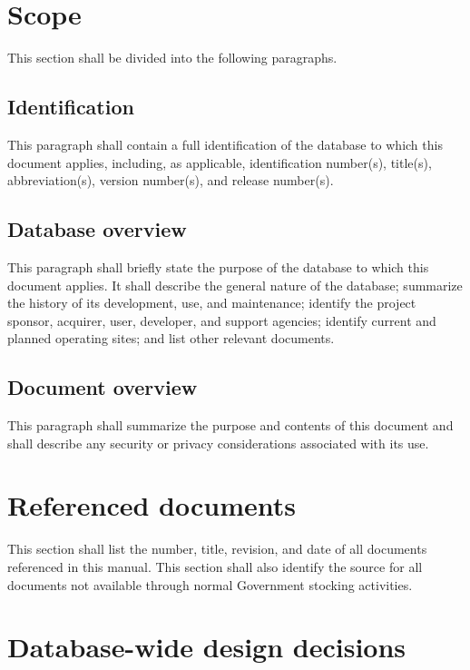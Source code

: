 \documentclass{fidata-report-template}
\begin{document}
\section{Scope}

This section shall be divided into the following paragraphs.

\subsection{Identification}

This paragraph shall contain a full identification of the database to
which this document applies, including, as applicable, identification
number(s), title(s), abbreviation(s), version number(s), and release
number(s).

\subsection{Database overview}

This paragraph shall briefly state the purpose of the database to which
this document applies. It shall describe the general nature of the
database; summarize the history of its development, use, and
maintenance; identify the project sponsor, acquirer, user, developer,
and support agencies; identify current and planned operating sites; and
list other relevant documents.

\subsection{Document overview}

This paragraph shall summarize the purpose and contents of this document
and shall describe any security or privacy considerations associated
with its use.

\section{Referenced documents}

This section shall list the number, title, revision, and date of all
documents referenced in this manual. This section shall also identify
the source for all documents not available through normal Government
stocking activities.

\section{Database-wide design decisions}
\end{document}
